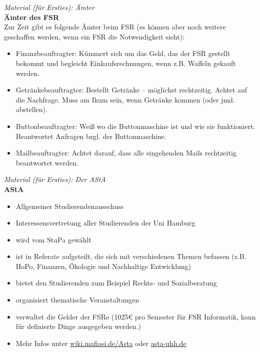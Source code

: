 \documentclass[a4paper,11pt]{scrartcl} %
\begin{document}
\begin{framed}
\textit{Material (für Ersties): Ämter}\\

\textbf{Ämter des FSR}\\
Zur Zeit gibt es folgende Ämter beim FSR (es können aber noch weitere
geschaffen werden, wenn ein FSR die Notwendigkeit sieht):
\begin{itemize}
\item Finanzbeauftragter: Kümmert sich um das Geld, das der FSR gestellt bekommt und begleicht Einkaufsrechnungen, wenn z.B. Waffeln gekauft werden.
\item Getränkebeauftragter: Bestellt Getränke -- möglichst rechtzeitig. Achtet auf die Nachfrage. Muss am Ikum sein, wenn Getränke kommen (oder jmd. abstellen).
\item Buttonbeauftragter: Weiß wo die Buttonmaschine ist und wie sie funktioniert. Beantwortet Anfragen bzgl. der Buttonmaschine.
\item Mailbeauftragter: Achtet darauf, dass alle eingehenden Mails rechtzeitig beantwortet werden.
\end{itemize}
\end{framed}


\begin{framed}
\textit{Material (für Ersties): Der AStA}\\

\textbf{AStA}\\
\begin{itemize}
\item Allgemeiner Studierendenausschuss 
\item Interessensvertretung aller Studierenden der Uni Hamburg
\item wird vom StuPa gewählt 
\item ist in Referate aufgeteilt, die sich mit verschiedenen Themen befassen (z.B. HoPo, Finanzen, Ökologie und Nachhaltige Entwicklung) 
\item bietet den Studierenden zum Beispiel Rechts- und Sozialberatung 
\item organisiert thematische Veranstaltungen 
\item verwaltet die Gelder der FSRe (1025€ pro Semester für FSR Informatik, kann für definierte Dinge ausgegeben werden.)
\item Mehr Infos unter \url{wiki.mafiasi.de/Asta} oder \url{asta-uhh.de}
\end{itemize}
\end{framed}
\end{document}

